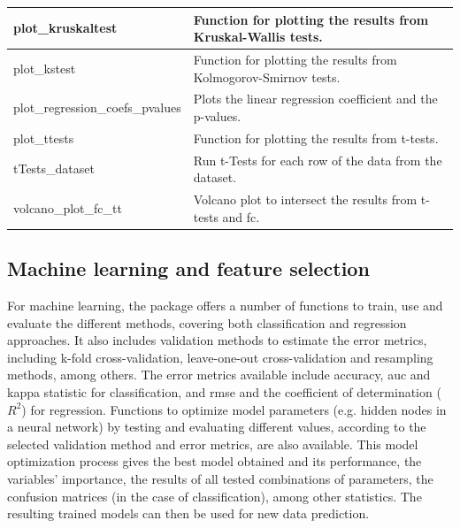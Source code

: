 \begin{scriptsize}
\begin{longtable}{|m{4.3cm}|m{11cm}|}
		\hline
		plot\_kruskaltest & Function for plotting the results from Kruskal-Wallis tests. \\
		
		\hline
		plot\_kstest & Function for plotting the results from Kolmogorov-Smirnov tests. \\
		
		\hline
		plot\_regression\_coefs\_pvalues & Plots the linear regression coefficient and the p-values. \\
		
		\hline
		plot\_ttests & Function for plotting the results from t-tests. \\
		
		\hline
		tTests\_dataset & Run t-Tests for each row of the data from the dataset. \\
		
		\hline
		volcano\_plot\_fc\_tt & Volcano plot to intersect the results from t-tests and \gls{fc}. \\
		
		\hline
		
	\end{longtable}
\end{scriptsize}


\subsection{Machine learning and feature selection}

For machine learning, the package offers a number of functions to train, use and evaluate the different methods, covering both classification and regression approaches. It also includes validation methods to estimate the error metrics, including k-fold cross-validation, leave-one-out cross-validation and resampling methods, among others. The error metrics available include accuracy, \gls{auc} and kappa statistic for classification, and \gls{rmse} and the coefficient of determination ($ R^{2} $) for regression. Functions to optimize model parameters (e.g. hidden nodes in a neural network) by testing and evaluating different values, according to the selected validation method and error metrics, are also available. This model optimization process gives the best model obtained and its performance, the variables’ importance, the results of all tested combinations of parameters, the confusion matrices (in the case of classification), among other statistics. The resulting trained models can then be used for new data prediction.

